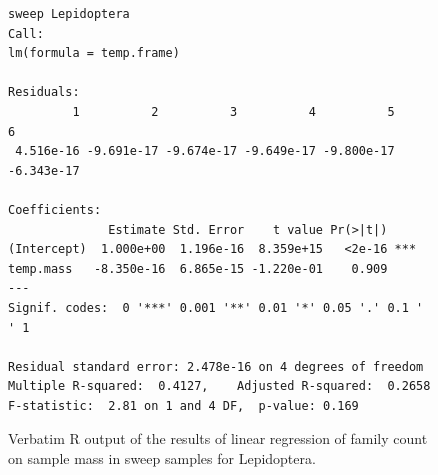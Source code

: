 \documentclass[10pt,letterpaper,twocolumn]{article}
\begin{document}
\begin{figure}[h]
	\lstset{numbers=left}
	\lstset{xleftmargin=5mm,framexleftmargin=5mm}
	\begin{lstlisting}
sweep Lepidoptera
Call:
lm(formula = temp.frame)

Residuals:
         1          2          3          4          5          6 
 4.516e-16 -9.691e-17 -9.674e-17 -9.649e-17 -9.800e-17 -6.343e-17 

Coefficients:
              Estimate Std. Error    t value Pr(>|t|)    
(Intercept)  1.000e+00  1.196e-16  8.359e+15   <2e-16 ***
temp.mass   -8.350e-16  6.865e-15 -1.220e-01    0.909    
---
Signif. codes:  0 '***' 0.001 '**' 0.01 '*' 0.05 '.' 0.1 ' ' 1

Residual standard error: 2.478e-16 on 4 degrees of freedom
Multiple R-squared:  0.4127,	Adjusted R-squared:  0.2658 
F-statistic:  2.81 on 1 and 4 DF,  p-value: 0.169
	\end{lstlisting}
	\caption{Verbatim R output of the results of linear regression of family count on sample mass in sweep samples for Lepidoptera.}
	\label{fig:sweep_lepidoptera_regression}
	\smallskip
	\nointerlineskip
	\hrulefill
\end{figure}
\end{document}

